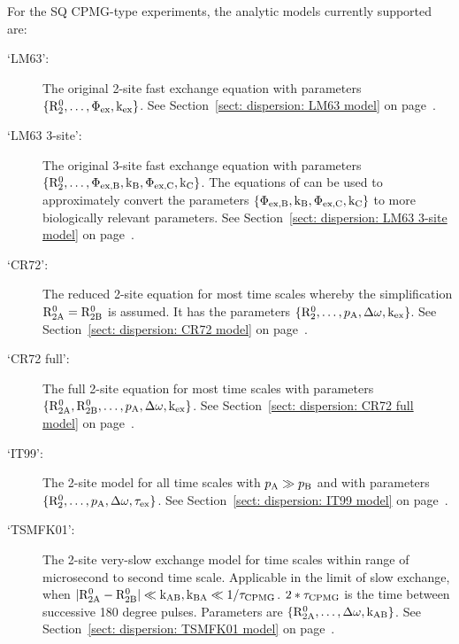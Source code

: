 For the SQ CPMG-type experiments, the analytic models currently supported are:
\begin{description}
  \item[`LM63':]  The original \citet{LuzMeiboom63} 2-site fast exchange equation with parameters $\{\mathrm{R}_2^0, \dots, \Phi_{\textrm{ex}}, \textrm{k}_{\textrm{ex}}\}$.
    See Section~\ref{sect: dispersion: LM63 model} on page~\pageref{sect: dispersion: LM63 model}.
  \item[`LM63 3-site':]  The original \citet{LuzMeiboom63} 3-site fast exchange equation with parameters $\{\mathrm{R}_2^0, \dots, \Phi_{\textrm{ex,B}}, \textrm{k}_{\textrm{B}}, \Phi_{\textrm{ex,C}}, \textrm{k}_{\textrm{C}}\}$.
    The equations of \citet{OConnell09} can be used to approximately convert the parameters $\{\Phi_{\textrm{ex,B}}, \textrm{k}_{\textrm{B}}, \Phi_{\textrm{ex,C}}, \textrm{k}_{\textrm{C}}\}$ to more biologically relevant parameters.
    See Section~\ref{sect: dispersion: LM63 3-site model} on page~\pageref{sect: dispersion: LM63 3-site model}.
  \item[`CR72':]  The reduced \citet{CarverRichards72} 2-site equation for most time scales whereby the simplification $\mathrm{R}_{\mathrm{2A}}^0 = \mathrm{R}_{\mathrm{2B}}^0$ is assumed.
    It has the parameters $\{\mathrm{R}_2^0, \dots, p_{\textrm{A}}, \Delta\omega, \textrm{k}_{\textrm{ex}}\}$.
    See Section~\ref{sect: dispersion: CR72 model} on page~\pageref{sect: dispersion: CR72 model}.
  \item[`CR72 full':]  The full \citet{CarverRichards72} 2-site equation for most time scales with parameters $\{\mathrm{R}_{\mathrm{2A}}^0, \mathrm{R}_{\mathrm{2B}}^0, \dots, p_{\textrm{A}}, \Delta\omega, \textrm{k}_{\textrm{ex}}\}$.
    See Section~\ref{sect: dispersion: CR72 full model} on page~\pageref{sect: dispersion: CR72 full model}.
  \item[`IT99':]  The \citet{IshimaTorchia99} 2-site model for all time scales with $p_{\textrm{A}} \gg p_{\textrm{B}}$ and with parameters $\{\mathrm{R}_2^0, \dots, p_{\textrm{A}}, \Delta\omega, \tau_{\textrm{ex}}\}$.
    See Section~\ref{sect: dispersion: IT99 model} on page~\pageref{sect: dispersion: IT99 model}.
  \item[`TSMFK01':]  The \citet{Tollinger01}  2-site very-slow exchange model for time scales within range of microsecond to second time scale.
    Applicable in the limit of slow exchange, when $|\mathrm{R}_{\mathrm{2A}}^0 - \mathrm{R}_{\mathrm{2B}}^0| \ll \textrm{k}_{\textrm{AB}}, \textrm{k}_{\textrm{BA}} \ll 1/\tau_{\textrm{CPMG}}$.
    $2*\tau_{\textrm{CPMG}}$ is the time between successive 180 degree pulses.
    Parameters are $\{\mathrm{R}_{\mathrm{2A}}^0, \dots, \Delta\omega, \textrm{k}_{\textrm{AB}}\}$.
    See Section~\ref{sect: dispersion: TSMFK01 model} on page~\pageref{sect: dispersion: TSMFK01 model}.

\end{description}
